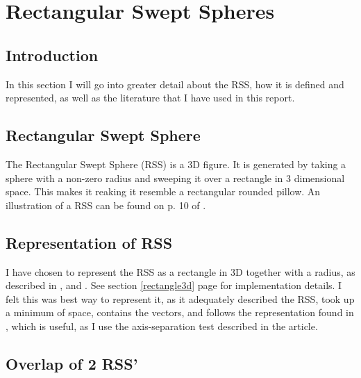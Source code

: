 
\section{Rectangular Swept Spheres}
\label{rss}

\subsection{Introduction}
In this section I will go into greater detail about the RSS, how it is defined and represented, as well as the literature that I have used in this report.

\subsection{Rectangular Swept Sphere}
The Rectangular Swept Sphere (RSS) is a 3D figure. It is generated by taking a sphere with a non-zero radius and sweeping it over a rectangle in 3 dimensional space. This makes it reaking it resemble a rectangular rounded pillow. An illustration of a RSS can be found on p. 10 of \cite{Larsen99fastproximity}. 

\subsection{Representation of RSS}
I have chosen to represent the RSS as a rectangle in 3D together with a radius, as described in \cite{larsen00fast}, \cite{Larsen99fastproximity} and \cite{237244}. See section \ref{rectangle3d} page \pageref{rectangle3d} for  implementation details. I felt this was best way to represent it, as it adequately described the RSS, took up a minimum of space, contains the vectors, and follows the representation found in \cite{237244}, which is useful, as I use the axis-separation test described in the article.

\subsection{Overlap of 2 RSS'}

